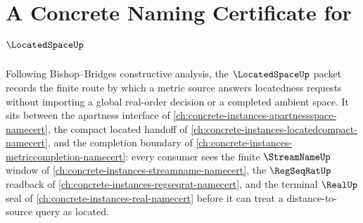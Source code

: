 \chapter{A Concrete Naming Certificate for $\LocatedSpaceUp$}
\label{ch:concrete-instances-locatedspace-namecert}

Following Bishop--Bridges constructive analysis, the $\LocatedSpaceUp$ packet records the finite route by which a metric source answers locatedness requests without importing a global real-order decision or a completed ambient space. It sits between the apartness interface of \autoref{ch:concrete-instances-apartnessspace-namecert}, the compact located handoff of \autoref{ch:concrete-instances-locatedcompact-namecert}, and the completion boundary of \autoref{ch:concrete-instances-metriccompletion-namecert}: every consumer sees the finite $\StreamNameUp$ window of \autoref{ch:concrete-instances-streamname-namecert}, the $\RegSeqRatUp$ readback of \autoref{ch:concrete-instances-regseqrat-namecert}, and the terminal $\RealUp$ seal of \autoref{ch:concrete-instances-real-namecert} before it can treat a distance-to-source query as located.

